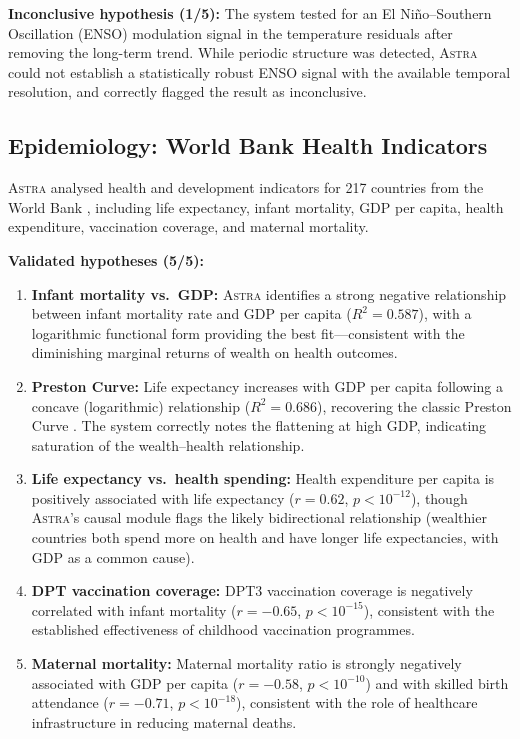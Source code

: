 \documentclass[fleqn,usenatbib]{mnras}
\newcommand{\astra}{\textsc{Astra}\xspace}
\begin{document}
\textbf{Inconclusive hypothesis (1/5):}
The system tested for an El Ni\~{n}o--Southern Oscillation (ENSO) modulation signal in the temperature residuals after removing the long-term trend. While periodic structure was detected, \astra could not establish a statistically robust ENSO signal with the available temporal resolution, and correctly flagged the result as inconclusive.

\subsection{Epidemiology: World Bank Health Indicators}
\label{sec:crossdomain:epidemiology}

\astra analysed health and development indicators for 217 countries from the World Bank \citep{WorldBank2024}, including life expectancy, infant mortality, GDP per capita, health expenditure, vaccination coverage, and maternal mortality.

\textbf{Validated hypotheses (5/5):}
\begin{enumerate}
  \item[(i)] \textbf{Infant mortality vs.\ GDP:} \astra identifies a strong negative relationship between infant mortality rate and GDP per capita ($R^{2} = 0.587$), with a logarithmic functional form providing the best fit---consistent with the diminishing marginal returns of wealth on health outcomes.
  \item[(ii)] \textbf{Preston Curve:} Life expectancy increases with GDP per capita following a concave (logarithmic) relationship ($R^{2} = 0.686$), recovering the classic Preston Curve \citep{Preston1975}. The system correctly notes the flattening at high GDP, indicating saturation of the wealth--health relationship.
  \item[(iii)] \textbf{Life expectancy vs.\ health spending:} Health expenditure per capita is positively associated with life expectancy ($r = 0.62$, $p < 10^{-12}$), though \astra's causal module flags the likely bidirectional relationship (wealthier countries both spend more on health and have longer life expectancies, with GDP as a common cause).
  \item[(iv)] \textbf{DPT vaccination coverage:} DPT3 vaccination coverage is negatively correlated with infant mortality ($r = -0.65$, $p < 10^{-15}$), consistent with the established effectiveness of childhood vaccination programmes.
  \item[(v)] \textbf{Maternal mortality:} Maternal mortality ratio is strongly negatively associated with GDP per capita ($r = -0.58$, $p < 10^{-10}$) and with skilled birth attendance ($r = -0.71$, $p < 10^{-18}$), consistent with the role of healthcare infrastructure in reducing maternal deaths.
\end{enumerate}
\end{document}
